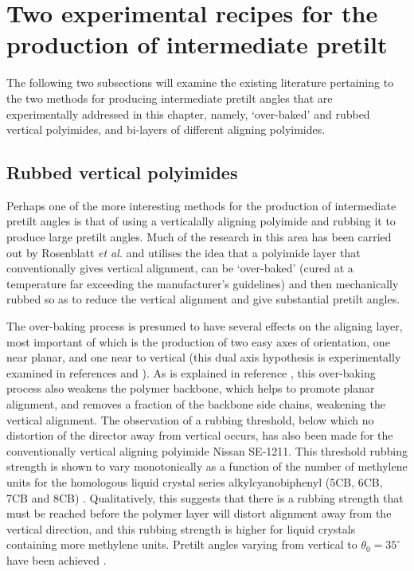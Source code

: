 \section{Two experimental recipes for the production of intermediate pretilt}
The following two subsections will examine the existing literature pertaining to the two methods for producing intermediate pretilt angles that are experimentally addressed in this chapter, namely, `over-baked' and rubbed vertical polyimides, and bi-layers of different aligning polyimides.

\subsection{Rubbed vertical polyimides}
\label{sec:over-baked}

Perhaps one of the more interesting methods for the production of intermediate pretilt angles is that of using a verticalally aligning polyimide and rubbing it to produce large pretilt angles. Much of the research in this area has been carried out by Rosenblatt \textit{et al.} \cite{Wang2007, Huang2005} and utilises the idea that a polyimide layer that conventionally gives vertical alignment, can be `over-baked' (cured at a temperature far exceeding the manufacturer's guidelines) and then mechanically rubbed so as to reduce the vertical alignment and give substantial pretilt angles.

The over-baking process is presumed to have several effects on the aligning layer, most important of which is the production of two easy axes of orientation, one near planar, and one near to vertical (this dual axis hypothesis is experimentally examined in references \cite{Shioda2003} and \cite{Syed2003}). As is explained in reference \cite{Huang2005}, this over-baking process also weakens the polymer backbone, which helps to promote planar alignment, and removes a fraction of the backbone side chains, weakening the vertical alignment. The observation of a rubbing threshold, below which no distortion of the director away from vertical occurs, has also been made for the conventionally vertical aligning polyimide Nissan SE-1211. This threshold rubbing strength is shown to vary monotonically as a function of the number of methylene units for the homologous liquid crystal series alkylcyanobiphenyl (5CB, 6CB, 7CB and 8CB) \cite{Huang2005}. Qualitatively, this suggests that there is a rubbing strength that must be reached before the polymer layer will distort alignment away from the vertical direction, and this rubbing strength is higher for liquid crystals containing more methylene units. Pretilt angles varying from vertical to $\theta_0=35^{\circ}$ have been achieved \cite{Huang2005}.


